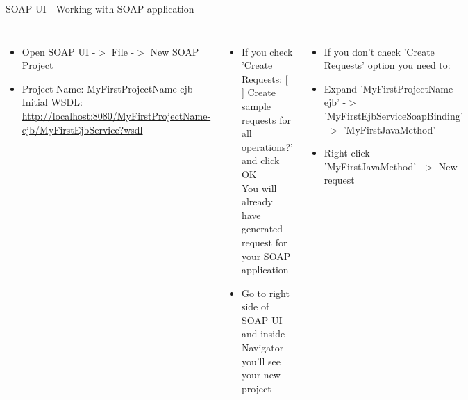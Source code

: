 \documentclass[aspectratio=1610,english]{beamer} %
\begin{document}
	\begin{frame}{SOAP UI - Working with SOAP application}
		\begin{columns}
				\begin{itemize}
					\tiny
					\color{black}
					\item Open SOAP UI -$>$ File -$>$ New SOAP Project
					\item Project Name: MyFirstProjectName-ejb \\ 
					Initial WSDL: \url{http://localhost:8080/MyFirstProjectName-ejb/MyFirstEjbService?wsdl}
				\end{itemize}
				\begin{minipage}{\textwidth}
				
				\end{minipage}
				\begin{itemize}
					\tiny
					\color{black}
					\item If you check 'Create Requests: [ ] Create sample requests for all operations?' and click OK \\
					You will already have generated request for your SOAP application
					\item Go to right side of SOAP UI and inside Navigator you'll see your new project
				\end{itemize}
				\begin{minipage}{\textwidth}
				\end{minipage}
				\begin{itemize}
					\tiny
					\color{black}
					\item If you don't check 'Create Requests' option you need to:
					\item Expand 'MyFirstProjectName-ejb' -$>$ 'MyFirstEjbServiceSoapBinding' -$>$ 'MyFirstJavaMethod'
					\item Right-click 'MyFirstJavaMethod' -$>$ New request 
				\end{itemize}
				

\end{columns}
\end{frame}
\end{document}
